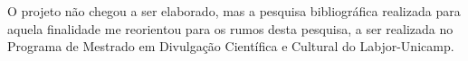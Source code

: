 O projeto não chegou a ser elaborado, mas a pesquisa bibliográfica realizada para aquela finalidade me reorientou para os rumos desta pesquisa, a ser realizada no Programa de Mestrado em Divulgação Científica e Cultural do Labjor-Unicamp.
